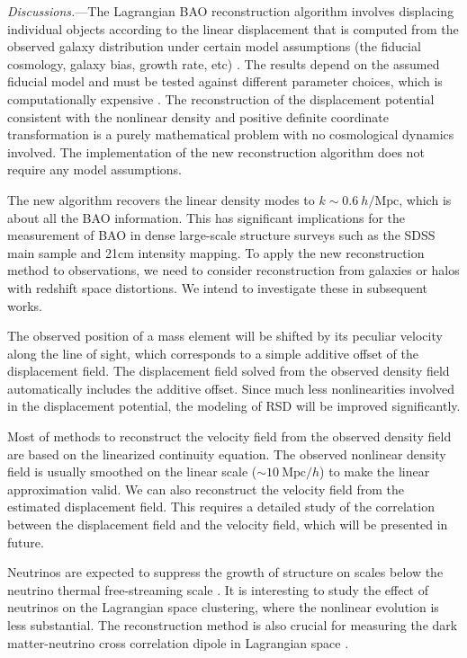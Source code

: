 \documentclass[aps,prl,twocolumn,showpacs,superscriptaddress,groupedaddress,nofootinbib]{revtex4}  %
\newcommand{\mr}{\mathrm}
\begin{document}
{\it Discussions.}---The Lagrangian BAO reconstruction algorithm involves displacing 
individual objects according to the linear displacement that is computed from the observed
galaxy distribution under certain model assumptions (the fiducial cosmology, galaxy bias, 
growth rate, etc) \cite{2007bao,2015marcel}.
The results depend on the assumed fiducial model and must be tested against different 
parameter choices, which is computationally expensive \cite{2012nikhil}.
The reconstruction of the displacement potential consistent with the nonlinear density
and positive definite coordinate transformation is a purely mathematical problem with no
cosmological dynamics involved. 
The implementation of the new reconstruction algorithm does not require any model assumptions.

The new algorithm recovers the linear density modes to $k\sim0.6\ h/\mr{Mpc}$, 
which is about all the BAO information.
This has significant implications for the measurement of BAO in dense 
large-scale structure surveys such as the SDSS main sample and 21cm intensity
mapping.
To apply the new reconstruction method to observations, we need to consider 
reconstruction from galaxies or halos with redshift space distortions.
We intend to investigate these in subsequent works. 

The observed position of a mass element will be shifted by its peculiar
velocity along the line of sight, which corresponds to a simple additive offset of
the displacement field. The displacement field solved from the observed density field
automatically includes the additive offset. 
Since much less nonlinearities involved in the displacement potential, the modeling of RSD
will be improved significantly.

Most of methods to reconstruct the velocity field from the observed density 
field are based on the linearized continuity equation.
The observed nonlinear density field is usually smoothed on the linear scale
($\sim10\ \mr{Mpc}/h$) to make the linear approximation valid.
We can also reconstruct the velocity field from the estimated displacement 
field.
This requires a detailed study of the correlation between the displacement 
field and the velocity field, which will be presented in future.

Neutrinos are expected to suppress the growth of structure on scales below the 
neutrino thermal free-streaming scale \cite{1980bond}. 
It is interesting to study the effect of neutrinos on the Lagrangian space 
clustering, where the nonlinear evolution is less substantial. 
The reconstruction method is also crucial for measuring the dark matter-neutrino cross 
correlation dipole in Lagrangian space \cite{2014zhm,2016zhm}. 
\end{document}
